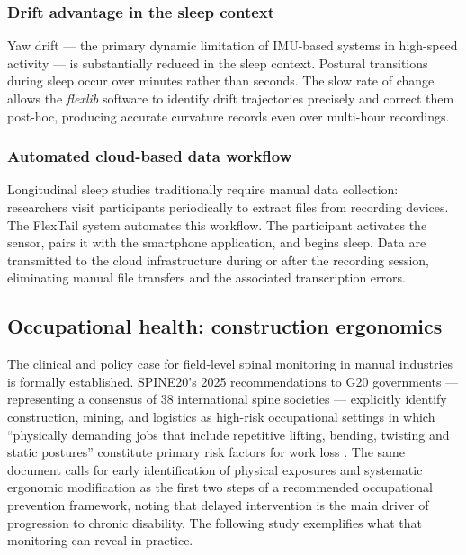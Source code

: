 \subsubsection{Drift advantage in the sleep context}

Yaw drift --- the primary dynamic limitation of IMU-based systems in high-speed
activity --- is substantially reduced in the sleep context.
Postural transitions during sleep occur over minutes rather than seconds.
The slow rate of change allows the \emph{flexlib} software to identify drift
trajectories precisely and correct them post-hoc, producing accurate curvature
records even over multi-hour recordings.

\subsubsection{Automated cloud-based data workflow}

Longitudinal sleep studies traditionally require manual data collection: researchers
visit participants periodically to extract files from recording devices.
The FlexTail system automates this workflow.
The participant activates the sensor, pairs it with the smartphone application, and
begins sleep.
Data are transmitted to the cloud infrastructure during or after the recording
session, eliminating manual file transfers and the associated transcription errors.

\subsection{Occupational health: construction ergonomics}

The clinical and policy case for field-level spinal monitoring in manual industries
is formally established.
SPINE20's 2025 recommendations to G20 governments --- representing a consensus of
38 international spine societies --- explicitly identify construction, mining, and
logistics as high-risk occupational settings in which ``physically demanding jobs
that include repetitive lifting, bending, twisting and static postures'' constitute
primary risk factors for work loss \cite{spine20_2025}.
The same document calls for early identification of physical exposures and systematic
ergonomic modification as the first two steps of a recommended occupational prevention
framework, noting that delayed intervention is the main driver of progression to
chronic disability.
The following study exemplifies what that monitoring can reveal in practice.

